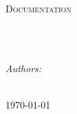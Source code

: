 \documentclass[
10pt, %
oneside, %
chapterinoneline,%
english, %
onehalfspacing, %
headsepline, %
]{style} %
\begin{document}
\frontmatter %

\pagestyle{plain} %


\begin{titlepage}
\begin{center}

{\scshape\LARGE \univname\par}\vspace{1.5cm} %
\textsc{\Large Documentation}\\[0.5cm] %

\HRule \\[0.4cm] %
{\huge \bfseries \ttitle\par}\vspace{0.4cm} %
\HRule \\[1.5cm] %
 
\begin{minipage}[t]{0.4\textwidth}
\begin{flushleft} \large
\emph{Authors:}\\
{\authorname} %
\end{flushleft}
\end{minipage}
\begin{minipage}[t]{0.4\textwidth}
\begin{flushright} \large

\end{flushright}
\end{minipage}\\[3cm]
 

\vfill
{\large \today}\\[4cm] %
 
\vfill
\end{center}
\end{titlepage}
\end{document}
